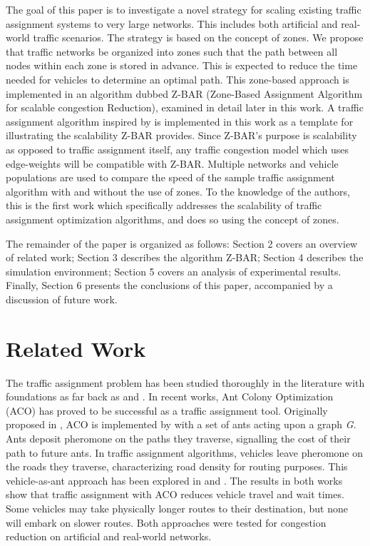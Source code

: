 \documentclass[conference]{IEEEtran}
\begin{document}
The goal of this paper is to investigate a novel strategy for scaling existing traffic assignment systems to very large networks. This includes both artificial and real-world traffic scenarios. The strategy is based on the concept of zones. We propose that traffic networks be organized into zones such that the path between all nodes within each zone is stored in advance. This is expected to reduce the time needed for vehicles to determine an optimal path. This zone-based approach is implemented in an algorithm dubbed Z-BAR (Zone-Based Assignment Algorithm for scalable congestion Reduction), examined in detail later in this work. A traffic assignment algorithm inspired by \cite{iaco} is implemented in this work as a template for illustrating the scalability Z-BAR provides. Since Z-BAR's purpose is scalability as opposed to traffic assignment itself, any traffic congestion model which uses edge-weights will be compatible with Z-BAR. Multiple networks and vehicle populations are used to compare the speed of the sample traffic assignment algorithm with and without the use of zones. To the knowledge of the authors, this is the first work which specifically addresses the scalability of traffic assignment optimization algorithms, and does so using the concept of zones.

The remainder of the paper is organized as follows: Section 2 covers an overview of related work; Section 3 describes the algorithm Z-BAR; Section 4 describes the simulation environment; Section 5 covers an analysis of experimental results. Finally, Section 6 presents the conclusions of this paper, accompanied by a discussion of future work.

\section{Related Work}

The traffic assignment problem has been studied thoroughly in the literature with foundations as far back as \cite{knight} and \cite{wardrop}. In recent works, Ant Colony Optimization (ACO) has proved to be successful as a traffic assignment tool. Originally proposed in \cite{dorigo}, ACO is implemented by with a set of ants acting upon a graph \textit{G}. Ants deposit pheromone on the paths they traverse, signalling the cost of their path to future ants. In traffic assignment algorithms, vehicles leave pheromone on the roads they traverse, characterizing road density for routing purposes. This vehicle-as-ant approach has been explored in \cite{iaco} and \cite{dtpos}. The results in both works show that traffic assignment with ACO reduces vehicle travel and wait times. Some vehicles may take physically longer routes to their destination, but none will embark on slower routes. Both approaches were tested for congestion reduction on artificial and real-world networks.
\end{document}
